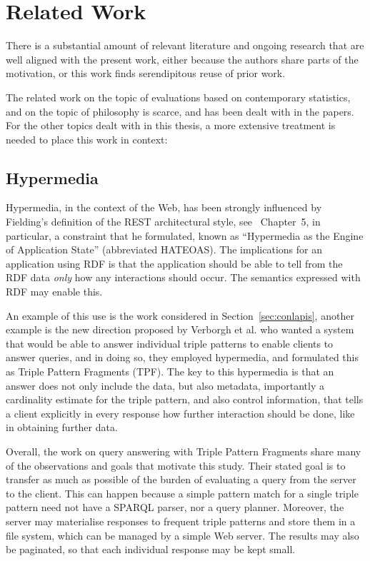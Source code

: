 \section{Related Work}\label{sec:related}

There is a substantial amount of relevant literature and ongoing
research that are well aligned with the present work, either because
the authors share parts of the motivation, or this work finds serendipitous
reuse of prior work.

The related work on the topic of evaluations based on contemporary
statistics, and on the topic of philosophy is scarce, and has been
dealt with in the papers. For the other topics dealt with in this
thesis, a more extensive treatment is needed to place this work in
context:

\subsection{Hypermedia}

Hypermedia, in the context of the Web, has been strongly influenced by
Fielding's definition of the REST architectural style, see
\cite{Fielding_2000_Architectural-Styles}~Chapter~5, in particular, a
constraint that he formulated, known as ``Hypermedia as the Engine of
Application State'' (abbreviated HATEOAS). The implications for an
application using RDF is that the application should be able to tell
from the RDF data \emph{only} how any interactions should occur. The
semantics expressed with RDF may enable this.

An example of this use is the work considered in
Section~\ref{sec:conlapis}, another example is the new direction
proposed by Verborgh et al. \cite{ldf1} who wanted a system that would
be able to answer individual triple patterns to enable clients to
answer queries, and in doing so, they employed hypermedia, and formulated
this as Triple Pattern Fragments (TPF). The key to this hypermedia is that
an answer does not only include the data, but also metadata,
importantly a cardinality estimate for the triple pattern, and also
control information, that tells a client explicitly in every response
how further interaction should be done, like in obtaining further data.

Overall, the work on query answering with Triple Pattern Fragments
share many of the observations and goals that
motivate this study. Their stated goal is to transfer as much as
possible of the burden of evaluating a query from the server to the
client. This can happen because a simple pattern match for a single
triple pattern need not have a SPARQL parser, nor a query
planner. Moreover, the server may materialise responses to frequent
triple patterns and store them in a file system, which can be managed
by a simple Web server. The results may also be paginated, so that each
individual response may be kept small. 

